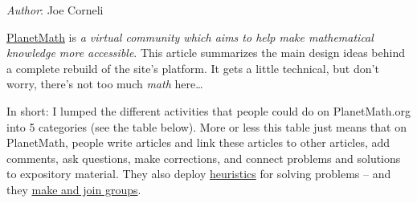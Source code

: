 \emph{Author}: Joe Corneli

\href{planetmath.org}{PlanetMath} is \emph{a virtual community which aims
to help make mathematical knowledge more accessible}. This article
summarizes the main design ideas behind a complete rebuild of the
site's platform. It gets a little technical, but don't worry, there's
not too much \emph{math} here\ldots{}

In short: I lumped the different activities that people could do on
PlanetMath.org into 5 categories (see the table below). More or less
this table just means that on PlanetMath, people write articles and link
these articles to other articles, add comments, ask questions, make
corrections, and connect problems and solutions to expository material.
They also deploy
\href{http://peeragogy.org/patterns-usecases/patterns-and-heuristics/}{heuristics}
for solving problems -- and they
\href{http://peeragogy.org/convening-group/}{make and join groups}.

